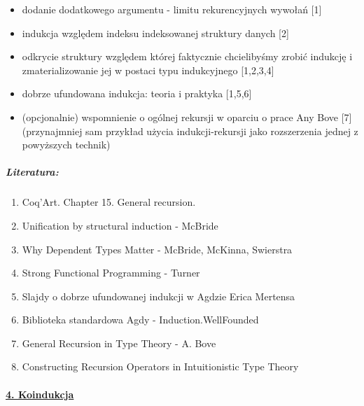 \documentclass[10pt, a4paper]{article}
\begin{document}
\begin{itemize}
\addtolength{\itemsep}{-0.5\baselineskip}

 \item 
    dodanie dodatkowego argumentu - limitu rekurencyjnych wywołań [1]
 \item 
    indukcja względem indeksu indeksowanej struktury danych [2]
 \item 
    odkrycie struktury względem której faktycznie chcielibyśmy zrobić indukcję i zmaterializowanie jej w postaci typu indukcyjnego [1,2,3,4]
 \item 
    dobrze ufundowana indukcja: teoria i praktyka [1,5,6]
 \item 
    (opcjonalnie) wspomnienie o ogólnej rekursji w oparciu o prace Any Bove [7] (przynajmniej sam przykład użycia indukcji-rekursji jako rozszerzenia jednej z powyższych technik)

\end{itemize}

\subparagraph{Literatura:}

\begin{enumerate}
\addtolength{\itemsep}{-0.5\baselineskip}

 \item
     Coq’Art. Chapter 15. General recursion.

\item
    Unification by structural induction - McBride
\item
    Why Dependent Types Matter - McBride, McKinna, Swierstra
\item
    Strong Functional Programming - Turner
\item
    Slajdy o dobrze ufundowanej indukcji w Agdzie Erica Mertensa
\item
    Biblioteka standardowa Agdy - Induction.WellFounded
\item
    General Recursion in Type Theory - A. Bove
\item
    Constructing Recursion Operators in Intuitionistic Type Theory
 
\end{enumerate}


\paragraph{\underline{4. Koindukcja}} 
\end{document}
